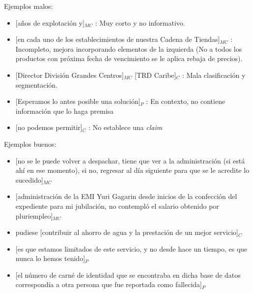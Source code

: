 \documentclass[a4paper,11pt,twocolumn,twoside]{article}
\begin{document}
Ejemplos malos:
\begin{itemize}
	\item \text{} [años de explotación y]$_{MC}$
	      : Muy corto y no informativo. %
	\item \text{} [en cada uno de los establecimientos de nuestra Cadena de Tiendas]$_{MC}$
	      : Incompleto, mejora incorporando elementos de la izquierda (No a todos los productos con próxima fecha de vencimiento se le aplica rebaja de precios). %
	\item \text{} [Director División Grandes Centros]$_{MC}$ [TRD Caribe]$_{C}$
	      : Mala clasificación y segmentación. %
	\item \text{} [Esperamos lo antes posible una solución]$_{P}$
	      : En contexto, no contiene información que lo haga premisa %
	\item \text{} [no podemos permitir]$_{C}$
	      : No establece una \textit{claim} %
\end{itemize}

Ejemplos buenos:
\begin{itemize}
	\item \text{} [no se le puede volver a despachar, tiene que ver a la administración (si está ahí en ese momento),
		      si no, regresar al día siguiente para que se le acredite lo sucedido]$_{MC}$ %
	\item \text{} [administración de la EMI Yuri Gagarin desde inicios de la confección del expediente para
		      mi jubilación, no contempló el salario obtenido por pluriempleo]$_{MC}$ %
	\item pudiese [contribuir al ahorro de agua y la prestación de un mejor servicio]$_C$ %
	\item \text{} [es que estamos limitados de este servicio, y no desde hace un tiempo, es que nunca lo hemos tenido]$_P$ %
	\item \text{} [el número de carné de identidad que se encontraba en dicha base de datos correspondía a otra persona que
		      fue reportada como fallecida]$_P$ %
\end{itemize}
\end{document}
